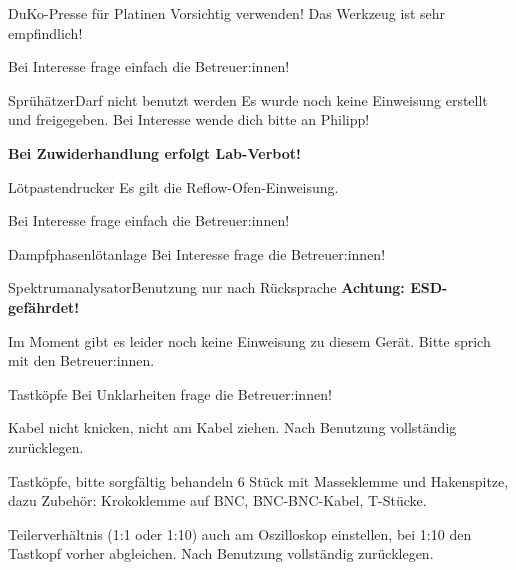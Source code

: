 \begin{schild}[farbe=gelb, einweisung=platinenaetzer-einweisung,
	kontakt={Max, \mail{technik@fablab.fau.de}}]
	{DuKo-Presse für Platinen}{}
Vorsichtig verwenden! Das Werkzeug ist sehr empfindlich!

Bei Interesse frage einfach die Betreuer:innen!
\end{schild}

\begin{schild}[farbe=rot, kontakt={Philipp, \mail{kontakt@fablab.fau.de}}]
	{Sprühätzer}{Darf nicht benutzt werden}
Es wurde noch keine Einweisung erstellt und freigegeben.
Bei Interesse wende dich bitte an Philipp!

\textbf{Bei Zuwiderhandlung erfolgt Lab-Verbot!}
\end{schild}

\begin{schild}[farbe=gelb, einweisung=reflow-ofen-einweisung,
	kontakt={Julian, \mail{julian.neureuther@fablab.fau.de}}]
	{Lötpastendrucker}{}
Es gilt die Reflow-Ofen-Einweisung.

Bei Interesse frage einfach die Betreuer:innen!
\end{schild}

\begin{schild}[farbe=gelb, modell=VaporPhase 1, einweisung=dampfphasenloetanlage-einweisung,
	symbole={W017, M004, P022}]
	{Dampfphasen\-lötanlage}{}
Bei Interesse frage die Betreuer:innen!
\end{schild}

\begin{schild}[farbe=rot, modell=Siglent SSA3021X, kontakt={Markus F+W, \mail{kontakt@fablab.fau.de}}]
	{Spektrumanalysator}{Benutzung nur nach Rücksprache}
\textbf{Achtung: ESD-gefährdet!}

Im Moment gibt es leider noch keine Einweisung zu diesem Gerät.
Bitte sprich mit den Betreuer:innen.
\end{schild}

\begin{schild}[farbe=gruen, einweisung=werkstatt-einweisung]
	{Tastköpfe}{\werkstattEinweisung}
Bei Unklarheiten frage die Betreuer:innen!

Kabel nicht knicken, nicht am Kabel ziehen.
Nach Benutzung vollständig zurücklegen.
\end{schild}

\begin{schild}[farbe=gelbgruen, modell={Testec, 250\,MHz / 20\,MHz, 1:10 / 1:1}, einweisung=werkstatt-einweisung]
	{Tastköpfe}{\werkstattEinweisung, bitte sorgfältig behandeln}
6 Stück mit Masseklemme und Hakenspitze, dazu Zubehör: Krokoklemme auf BNC,
BNC-BNC-Kabel, T-Stücke.

Teilerverhältnis (1:1 oder 1:10) auch am Oszilloskop einstellen, bei 1:10 den
Tastkopf vorher abgleichen. Nach Benutzung vollständig zurücklegen.
\end{schild}


